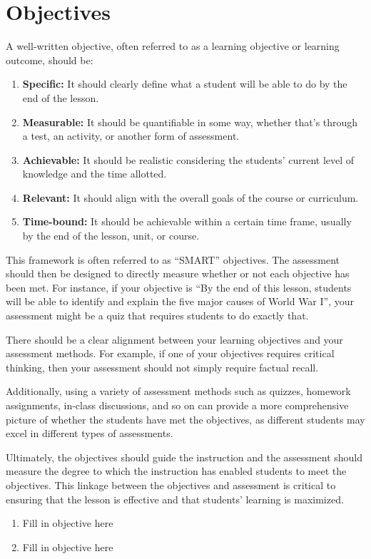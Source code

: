 \documentclass[main.tex]{subfiles}
\begin{document}
\section*{Objectives}

\setlength{\parindent}{0in}

A well-written objective, often referred to as a learning objective or learning outcome, should be:

\begin{enumerate}
  \item \textbf{Specific:} It should clearly define what a student will be able to do by the end of the lesson.
  \item \textbf{Measurable:} It should be quantifiable in some way, whether that's through a test, an activity, or another form of assessment.
  \item \textbf{Achievable:} It should be realistic considering the students' current level of knowledge and the time allotted.
  \item \textbf{Relevant:} It should align with the overall goals of the course or curriculum.
  \item \textbf{Time-bound:} It should be achievable within a certain time frame, usually by the end of the lesson, unit, or course.
\end{enumerate}

\setlength{\parindent}{0.25in}
This framework is often referred to as ``SMART'' objectives. The assessment should then be designed to directly measure whether or not each objective has been met. For instance, if your objective is ``By the end of this lesson, students will be able to identify and explain the five major causes of World War I'', your assessment might be a quiz that requires students to do exactly that. 

There should be a clear alignment between your learning objectives and your assessment methods. For example, if one of your objectives requires critical thinking, then your assessment should not simply require factual recall. 

Additionally, using a variety of assessment methods such as quizzes, homework assignments, in-class discussions, and so on can provide a more comprehensive picture of whether the students have met the objectives, as different students may excel in different types of assessments. 

Ultimately, the objectives should guide the instruction and the assessment should measure the degree to which the instruction has enabled students to meet the objectives. This linkage between the objectives and assessment is critical to ensuring that the lesson is effective and that students' learning is maximized.


\begin{enumerate}
  \item  Fill in objective here
  \item  Fill in objective here
\end{enumerate}
\end{document}
